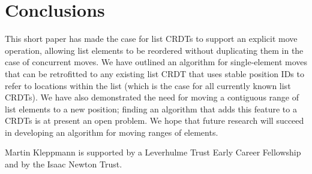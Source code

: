 \documentclass[sigplan,10pt]{acmart}
\begin{document}






\section{Conclusions}

This short paper has made the case for list CRDTs to support an explicit move operation, allowing list elements to be reordered without duplicating them in the case of concurrent moves.
We have outlined an algorithm for single-element moves that can be retrofitted to any existing list CRDT that uses stable position IDs to refer to locations within the list (which is the case for all currently known list CRDTs).
We have also demonstrated the need for moving a contiguous range of list elements to a new position; finding an algorithm that adds this feature to a CRDTs is at present an open problem.
We hope that future research will succeed in developing an algorithm for moving ranges of elements.

\begin{acks}
Martin Kleppmann is supported by a Leverhulme Trust Early Career Fellowship and by the Isaac Newton Trust.
\end{acks}

\balance

{}
\end{document}
